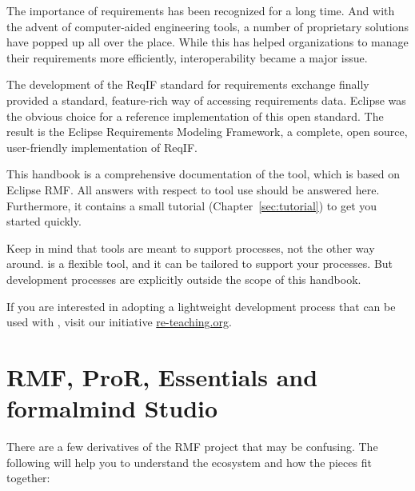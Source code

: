 % 

The importance of requirements has been recognized for a long time.  And with the advent of computer-aided engineering tools, a number of proprietary solutions have popped up all over the place.  While this has helped organizations to manage their requirements more efficiently, interoperability became a major issue.

The development of the ReqIF standard for requirements exchange finally provided a standard, feature-rich way of accessing requirements data.  Eclipse was the obvious choice for a reference implementation of this open standard.  The result is the Eclipse Requirements Modeling Framework, a complete, open source, user-friendly implementation of ReqIF.

This handbook is a comprehensive documentation of the \pror{} tool, which is based on Eclipse RMF.  All answers with respect to tool use should be answered here.  Furthermore, it contains a small tutorial (Chapter~\ref{sec:tutorial}) to get you started quickly.

Keep in mind that tools are meant to support processes, not the other way around.  \pror{} is a flexible tool, and it can be tailored to support your processes.  But development processes are explicitly outside the scope of this handbook.

\begin{info}
If you are interested in adopting a lightweight development process that can be used with \pror{}, visit our initiative \href{http://re-teaching.org}{re-teaching.org}.
\end{info}

\section{RMF, ProR, Essentials and formalmind Studio}

There are a few derivatives of the RMF project that may be confusing.  The following will
help you to understand the ecosystem and how the pieces fit together:

